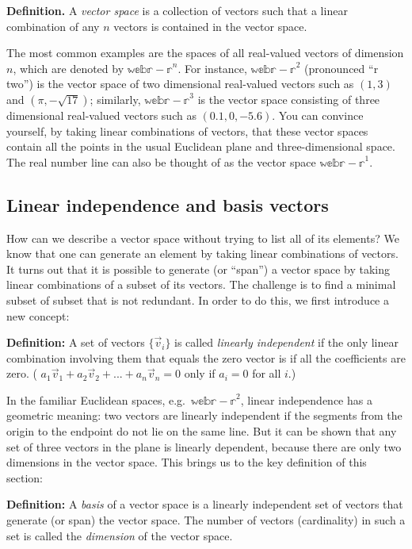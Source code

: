 \documentclass[
  letterpaper,
  DIV=11,
  numbers=noendperiod]{scrreprt}
\begin{document}
\textbf{Definition.} A \emph{vector space} is a collection of vectors
such that a linear combination of any \(n\) vectors is contained in the
vector space.

The most common examples are the spaces of all real-valued vectors of
dimension \(n\), which are denoted by \(\mathbb{webr-r}^n\). For
instance, \(\mathbb{webr-r}^2\) (pronounced ``r two'') is the vector
space of two dimensional real-valued vectors such as \((1,3)\) and
\((\pi, -\sqrt{17})\); similarly, \(\mathbb{webr-r}^3\) is the vector
space consisting of three dimensional real-valued vectors such as
\((0.1,0,-5.6)\). You can convince yourself, by taking linear
combinations of vectors, that these vector spaces contain all the points
in the usual Euclidean plane and three-dimensional space. The real
number line can also be thought of as the vector space
\(\mathbb{webr-r}^1\).

\subsection{Linear independence and basis
vectors}\label{linear-independence-and-basis-vectors}

How can we describe a vector space without trying to list all of its
elements? We know that one can generate an element by taking linear
combinations of vectors. It turns out that it is possible to generate
(or ``span'') a vector space by taking linear combinations of a subset
of its vectors. The challenge is to find a minimal subset of subset that
is not redundant. In order to do this, we first introduce a new concept:

\textbf{Definition:} A set of vectors \(\{ \vec v_i \}\) is called
\emph{linearly independent} if the only linear combination involving
them that equals the zero vector is if all the coefficients are zero. (
\(a_1 \vec v_1 + a_2 \vec v_2 + ... + a_n \vec v_n = 0\) only if
\(a_i = 0\) for all \(i\).)

In the familiar Euclidean spaces, e.g.~\(\mathbb{webr-r}^2\), linear
independence has a geometric meaning: two vectors are linearly
independent if the segments from the origin to the endpoint do not lie
on the same line. But it can be shown that any set of three vectors in
the plane is linearly dependent, because there are only two dimensions
in the vector space. This brings us to the key definition of this
section:

\textbf{Definition:} A \emph{basis} of a vector space is a linearly
independent set of vectors that generate (or span) the vector space. The
number of vectors (cardinality) in such a set is called the
\emph{dimension} of the vector space.
\end{document}
